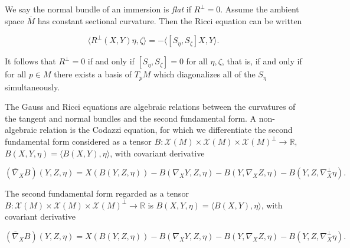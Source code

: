 \begin{remark}
  \label{rem:dc-ch6-3-3}
  \leanok
  \sketch
  We say the normal bundle of an immersion is \emph{flat} if $R^\perp=0$. Assume the
  ambient space $\overline{M}$ has constant sectional curvature. Then the Ricci
  equation can be written
  
  $$
  \langle R^\perp(X,Y)\eta,\zeta\rangle=-\langle[S_\eta,S_\zeta]X,Y\rangle.
  $$
  
  It follows that $R^\perp=0$ if and only if $[S_\eta,S_\zeta]=0$ for all
  $\eta,\zeta$, that is, if and only if for all $p\in M$ there exists a basis of
  $T_pM$ which diagonalizes all of the $S_\eta$ simultaneously.
  
  The Gauss and Ricci equations are algebraic relations between the curvatures of
  the tangent and normal bundles and the second fundamental form. A non-algebraic
  relation is the Codazzi equation, for which we differentiate the second
  fundamental form considered as a tensor
  $B:\mathcal{X}(M)\times\mathcal{X}(M)\times\mathcal{X}(M)^\perp\to\mathbb{R}$,
  $B(X,Y,\eta)=\langle B(X,Y),\eta\rangle$, with covariant derivative
  
  $$
  (\overline{\nabla}_X B)(Y,Z,\eta)=X(B(Y,Z,\eta))-B(\nabla_X Y,Z,\eta)-B(Y,\nabla_X Z,\eta)-B(Y,Z,\nabla_X^\perp\eta).
  $$
\end{remark}

\begin{definition}
  \label{def:dc-ch6-3-covderiv-B}
  \leanok
  The second fundamental form regarded as a tensor
  $B:\mathcal{X}(M)\times\mathcal{X}(M)\times\mathcal{X}(M)^\perp\to\mathbb{R}$
  is $B(X,Y,\eta)=\langle B(X,Y),\eta\rangle$, with covariant derivative

  $$
  (\overline{\nabla}_X B)(Y,Z,\eta)=X(B(Y,Z,\eta))-B(\nabla_X Y,Z,\eta)-B(Y,\nabla_X Z,\eta)-B(Y,Z,\nabla_X^\perp\eta).
  $$
\end{definition}

